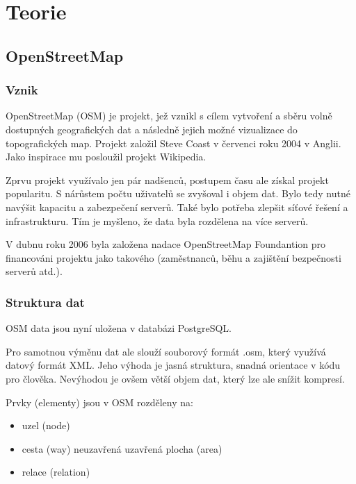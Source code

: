 \chapter{Teorie}
\label{2-Teorie}

\section{OpenStreetMap}
\label{OpenStreetMap}

\subsection{Vznik}
\label{vznik}
OpenStreetMap (OSM) je projekt, jež vznikl s cílem vytvoření a sběru 
volně dostupných geografických dat a následně jejich možné vizualizace
do topografických map. Projekt založil Steve Coast v červenci roku 
2004 v Anglii. Jako inspirace mu posloužil projekt Wikipedia.

Zprvu projekt využívalo jen pár nadšenců, postupem času ale získal
projekt popularitu. S nárůstem počtu uživatelů se zvyšoval i objem dat.
Bylo tedy nutné navýšit kapacitu a zabezpečení serverů.
Také bylo potřeba zlepšit síťové řešení a infrastrukturu.
Tím je myšleno, že data byla rozdělena na více serverů.

V dubnu roku 2006 byla založena nadace OpenStreetMap Foundantion pro financováni 
projektu jako takového (zaměstnanců, běhu a zajištění bezpečnosti serverů atd.). \cite{wikiOSM}

\subsection{Struktura dat}
\label{struktura dat}
OSM data jsou nyní uložena v databázi PostgreSQL. \cite{OSMserver}

Pro samotnou výměnu dat ale slouží souborový formát {.osm}, který využívá datový
formát  XML. 
Jeho výhoda je jasná struktura, snadná orientace v kódu pro člověka. 
Nevýhodou je ovšem větší objem dat, který lze ale snížit kompresí. 

Prvky (elementy) jsou v OSM rozděleny na:
\begin{itemize}
    \item uzel (node) 
    \item cesta (way)
        \subitem neuzavřená
        \subitem uzavřená
        \subitem plocha (area)
    \item relace (relation) 
\end{itemize}

